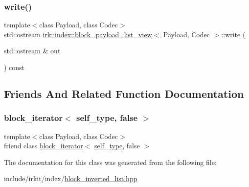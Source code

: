 \mbox{\label{classirk_1_1index_1_1block__payload__list__view_af2ec3b8d5a76b9224531d444812c057c}} 
\subsubsection{\texorpdfstring{write()}{write()}}
{\footnotesize\ttfamily template$<$class Payload, class Codec$>$ \\
std\+::ostream \mbox{\hyperlink{classirk_1_1index_1_1block__payload__list__view}{irk\+::index\+::block\+\_\+payload\+\_\+list\+\_\+view}}$<$ Payload, Codec $>$\+::write (\begin{DoxyParamCaption}\item[{std\+::ostream \&}]{out }\end{DoxyParamCaption}) const\hspace{0.3cm}{\ttfamily [inline]}}



\subsection{Friends And Related Function Documentation}
\mbox{\label{classirk_1_1index_1_1block__payload__list__view_a88a9a271d334c6a1ee36182f15227581}} 
\subsubsection{\texorpdfstring{block\+\_\+iterator$<$ self\+\_\+type, false $>$}{block\_iterator< self\_type, false >}}
{\footnotesize\ttfamily template$<$class Payload, class Codec$>$ \\
friend class \mbox{\hyperlink{classirk_1_1index_1_1block__iterator}{block\+\_\+iterator}}$<$ \mbox{\hyperlink{classirk_1_1index_1_1block__payload__list__view_ad73e053770215907333add2295707aec}{self\+\_\+type}}, false $>$\hspace{0.3cm}{\ttfamily [friend]}}



The documentation for this class was generated from the following file\+:\begin{DoxyCompactItemize}
\item 
include/irkit/index/\mbox{\hyperlink{block__inverted__list_8hpp}{block\+\_\+inverted\+\_\+list.\+hpp}}\end{DoxyCompactItemize}
